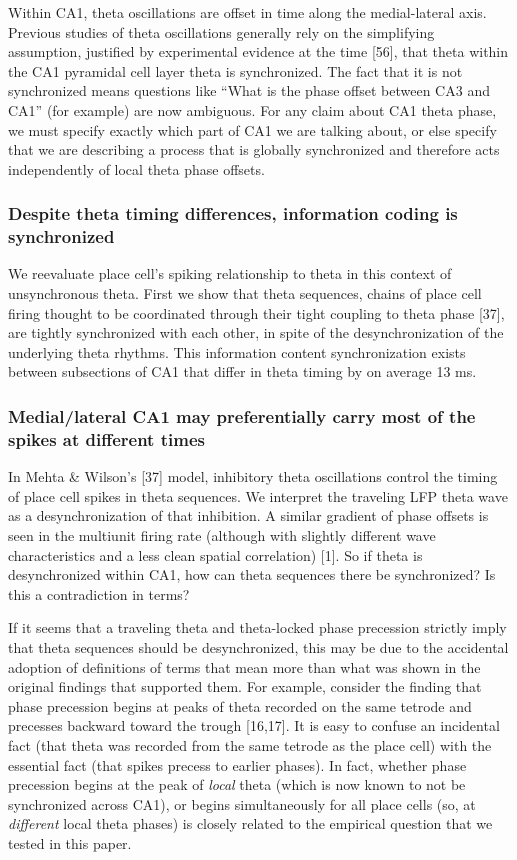 \documentclass[]{article}
\begin{document}
Within CA1, theta oscillations are offset in time along the
medial-lateral axis. Previous studies of theta oscillations generally
rely on the simplifying assumption, justified by experimental evidence
at the time {[}56{]}, that theta within the CA1 pyramidal cell layer
theta is synchronized. The fact that it is not synchronized means
questions like ``What is the phase offset between CA3 and CA1'' (for
example) are now ambiguous. For any claim about CA1 theta phase, we must
specify exactly which part of CA1 we are talking about, or else specify
that we are describing a process that is globally synchronized and
therefore acts independently of local theta phase offsets.

\subsubsection{Despite theta timing differences, information coding is
synchronized}

We reevaluate place cell's spiking relationship to theta in this context
of unsynchronous theta. First we show that theta sequences, chains of
place cell firing thought to be coordinated through their tight coupling
to theta phase {[}37{]}, are tightly synchronized with each other, in
spite of the desynchronization of the underlying theta rhythms. This
information content synchronization exists between subsections of CA1
that differ in theta timing by on average 13 ms.

\subsubsection{Medial/lateral CA1 may preferentially carry most of the
spikes at different times}

In Mehta \& Wilson's {[}37{]} model, inhibitory theta oscillations
control the timing of place cell spikes in theta sequences. We interpret
the traveling LFP theta wave as a desynchronization of that inhibition.
A similar gradient of phase offsets is seen in the multiunit firing rate
(although with slightly different wave characteristics and a less clean
spatial correlation) {[}1{]}. So if theta is desynchronized within CA1,
how can theta sequences there be synchronized? Is this a contradiction
in terms?

If it seems that a traveling theta and theta-locked phase precession
strictly imply that theta sequences should be desynchronized, this may
be due to the accidental adoption of definitions of terms that mean more
than what was shown in the original findings that supported them. For
example, consider the finding that phase precession begins at peaks of
theta recorded on the same tetrode and precesses backward toward the
trough {[}16,17{]}. It is easy to confuse an incidental fact (that theta
was recorded from the same tetrode as the place cell) with the essential
fact (that spikes precess to earlier phases). In fact, whether phase
precession begins at the peak of \emph{local} theta (which is now known
to not be synchronized across CA1), or begins simultaneously for all
place cells (so, at \emph{different} local theta phases) is closely
related to the empirical question that we tested in this paper.
\end{document}
